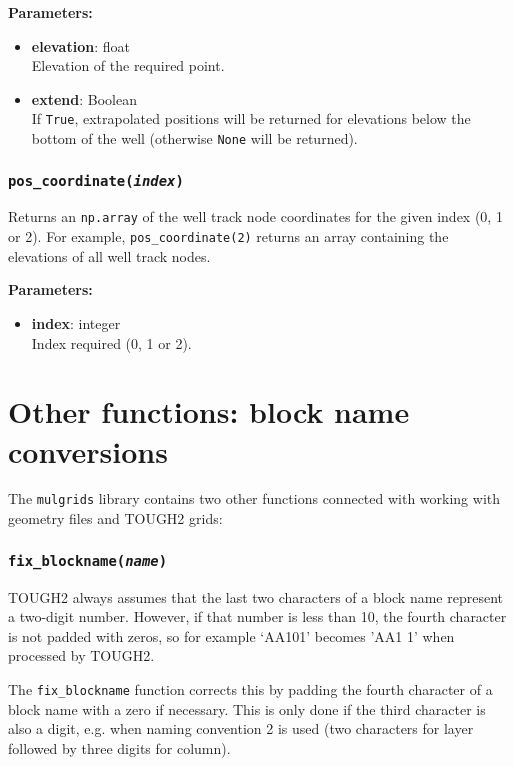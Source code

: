 \textbf{Parameters:}
\begin{itemize}
\item \textbf{elevation}: float\\
  Elevation of the required point.
\item \textbf{extend}: Boolean\\
  If \texttt{True}, extrapolated positions will be returned for elevations below the bottom of the well (otherwise \texttt{None} will be returned).
\end{itemize}

\subsubsection{\texttt{pos\_coordinate(\emph{index})}}
\label{sec:well:pos_coordinate}

Returns an \texttt{np.array} of the well track node coordinates for the given index (0, 1 or 2).  For example, \texttt{pos\_coordinate(2)} returns an array containing the elevations of all well track nodes.

\textbf{Parameters:}
\begin{itemize}
\item \textbf{index}: integer\\
  Index required (0, 1 or 2).
\end{itemize}

\section{Other functions: block name conversions}

The \texttt{mulgrids} library contains two other functions connected with working with geometry files and TOUGH2 grids:

\subsubsection{\texttt{fix\_blockname(\emph{name})}}

TOUGH2 always assumes that the last two characters of a block name represent a two-digit number.  However, if that number is less than 10, the fourth character is not padded with zeros, so for example `AA101' becomes 'AA1 1' when processed by TOUGH2.

The \texttt{fix\_blockname} function corrects this by padding the fourth character of a block name with a zero if necessary.  This is only done if the third character is also a digit, e.g. when naming convention 2 is used (two characters for layer followed by three digits for column).

